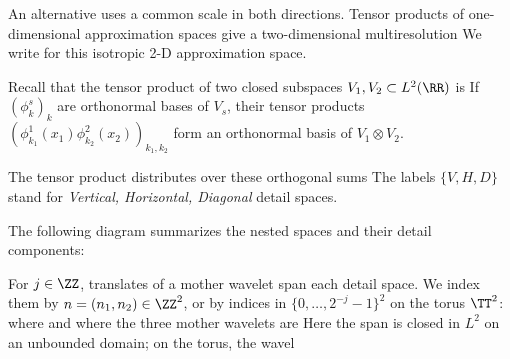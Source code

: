An alternative uses a common scale in both directions. Tensor products of one-dimensional approximation spaces give a two-dimensional multiresolution
We write
for this isotropic 2-D approximation space.

Recall that the tensor product of two closed subspaces $V_1,V_2\subset L^2(\RR)$ is
If $(\phi_k^s)_k$ are orthonormal bases of $V_s$, their tensor products $(\phi_{k_1}^1(x_1)\phi_{k_2}^2(x_2))_{k_1,k_2}$ form an orthonormal basis of $V_1 \otimes V_2$.

The tensor product distributes over these orthogonal sums
The labels $\{V,H,D\}$ stand for \textit{Vertical, Horizontal, Diagonal} detail spaces.
 
The following diagram summarizes the nested spaces and their detail components:
\begin{center}
\end{center}

For $j \in \ZZ$, translates of a mother wavelet span each detail space. We index them by $n=(n_1,n_2)\in\ZZ^2$, or by indices in $\{0,\ldots,2^{-j}-1\}^2$ on the torus $\TT^2$:
where
and where the three mother wavelets are
Here the span is closed in $L^2$ on an unbounded domain; on the torus, the wavel